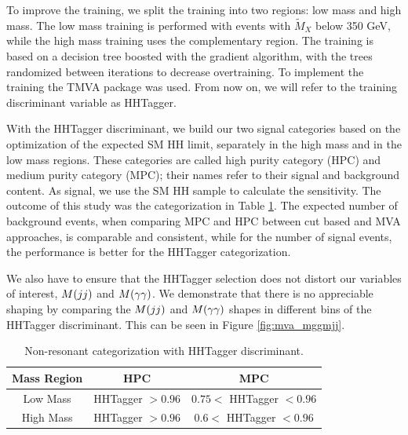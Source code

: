 To improve the training, we split the training into two regions: low mass and high mass. 
The low mass training is performed with events with $\tilde{M}_{X}$ below 350 GeV, while the high mass training uses the complementary region. 
The training is based on a decision tree boosted with the gradient algorithm, with the trees randomized between iterations to decrease overtraining. 
To implement the training the TMVA package was used. 
From now on, we will refer to the training discriminant variable as HHTagger.

With the HHTagger discriminant, we build our two signal categories based on the optimization of the expected SM HH limit, separately in the high mass and in the low mass regions. 
These categories are called high purity category (HPC) and medium purity category (MPC); their names refer to their signal and background content. 
As signal, we use the SM HH sample to calculate the sensitivity. 
The outcome of this study was the categorization in Table \ref{tab:catmva}. 
The expected number of background events, when comparing MPC and HPC between cut based and MVA approaches, is comparable and consistent, while for the number of signal events, the performance is better for the HHTagger categorization. 

We also have to ensure that the HHTagger selection does not distort our variables of interest, $M(jj)$ and $M(\gamma\gamma)$. 
We demonstrate that there is no appreciable shaping by comparing the $M(jj)$ and $M(\gamma\gamma)$ shapes in different bins of the HHTagger discriminant. 
This can be seen in Figure \ref{fig:mva_mggmjj}. 

\begin{table}
\centering
    \begin{tabular}{| c | c | c |}
    \hline
    Mass Region & HPC & MPC \\ \hline
    Low Mass & HHTagger $> 0.96$ & $ 0.75 < $ HHTagger $ < 0.96 $ \\ \hline 
    High Mass & HHTagger $> 0.96$ & $ 0.6 < $ HHTagger $ < 0.96 $ \\ \hline 
    \end{tabular}
\caption{Non-resonant categorization with HHTagger discriminant.}
\label{tab:catmva}
\end{table}



